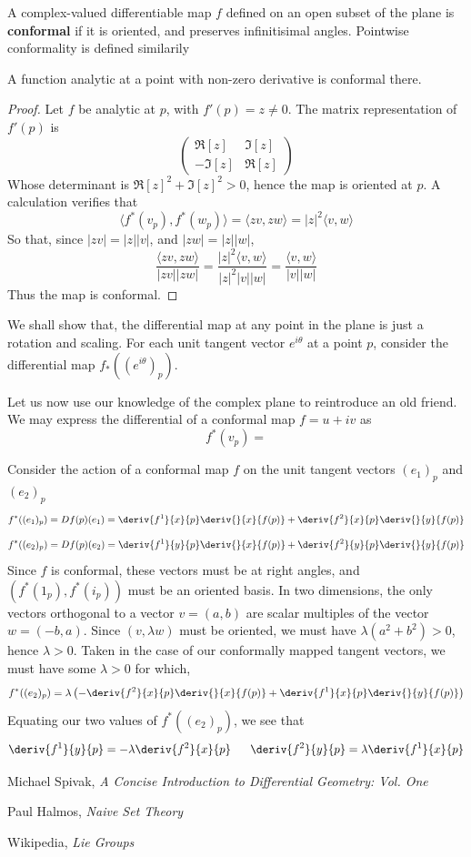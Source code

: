 \begin{definition}
    A complex-valued differentiable map $f$ defined on an open subset of the plane is {\bf conformal} if it is oriented, and preserves infinitisimal angles. Pointwise conformality is defined similarily
\end{definition}

\begin{lemma}
    A function analytic at a point with non-zero derivative is conformal there.
\end{lemma}
\begin{proof}
    Let $f$ be analytic at $p$, with $f'(p) = z \neq 0$. The matrix representation of $f'(p)$ is
    \[ \begin{pmatrix} \Re[z] & \Im[z] \\ -\Im[z] & \Re[z] \end{pmatrix} \]
    Whose determinant is $\Re[z]^2 + \Im[z]^2 > 0$, hence the map is oriented at $p$. A calculation verifies that
    \[ \langle f^*(v_p), f^*(w_p) \rangle = \langle zv, zw \rangle = |z|^2 \langle v, w \rangle  \]
    So that, since $|zv| = |z||v|$, and $|zw| = |z||w|$,
    \[ \frac{\langle zv, zw \rangle}{|zv||zw|} = \frac{|z|^2 \langle v, w \rangle }{|z|^2|v||w|} = \frac{\langle v, w \rangle}{|v||w|} \]
    Thus the map is conformal.
\end{proof}

We shall show that, the differential map at any point in the plane is just a rotation and scaling. For each unit tangent vector $e^{i\theta}$ at a point $p$, consider the differential map $f_*((e^{i\theta})_p)$.

Let us now use our knowledge of the complex plane to reintroduce an old friend. We may express the differential of a conformal map $f = u + iv$ as
%
\[ f^*(v_p) = \]

Consider the action of a conformal map $f$ on the unit tangent vectors $(e_1)_p$ and $(e_2)_p$
%
\[ f^*((e_1)_p) = Df(p)(e_1) = \deriv{f^1}{x}{p} \deriv{}{x}{f(p)} + \deriv{f^2}{x}{p} \deriv{}{y}{f(p)} \]
%
\[ f^*((e_2)_p) = Df(p)(e_2) = \deriv{f^1}{y}{p} \deriv{}{x}{f(p)} + \deriv{f^2}{y}{p} \deriv{}{y}{f(p)} \]
%
Since $f$ is conformal, these vectors must be at right angles, and $(f^*(1_p), f^*(i_p))$ must be an oriented basis. In two dimensions, the only vectors orthogonal to a vector $v = (a,b)$ are scalar multiples of the vector $w = (-b,a)$. Since $(v, \lambda w)$ must be oriented, we must have $\lambda (a^2 + b^2) > 0$, hence $\lambda > 0$. Taken in the case of our conformally mapped tangent vectors, we must have some $\lambda > 0$ for which,
%
\[ f^*((e_2)_p) = \lambda \left( -\deriv{f^2}{x}{p} \deriv{}{x}{f(p)} + \deriv{f^1}{x}{p} \deriv{}{y}{f(p)} \right) \]
%
Equating our two values of $f^*((e_2)_p)$, we see that
%
\[ \deriv{f^1}{y}{p} = - \lambda \deriv{f^2}{x}{p}\ \ \ \ \ \deriv{f^2}{y}{p} = \lambda \deriv{f^1}{x}{p} \]

\begin{thebibliography}{10}
     Michael Spivak,
    \emph{A Concise Introduction to Differential Geometry: Vol. One}

     Paul Halmos,
    \emph{Naive Set Theory}

     Wikipedia,
    \emph{Lie Groups}
\end{thebibliography}

